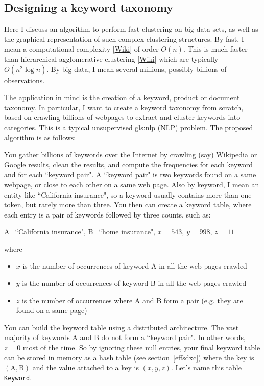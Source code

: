 \documentclass[oneside,10pt]{book}
\begin{document}
\subsection{Designing a keyword taxonomy}

Here I discuss an algorithm to perform fast clustering on big data sets, as well as the graphical representation of such complex clustering structures. By fast, I mean a \textcolor{index}{computational complexity} [\href{https://en.wikipedia.org/wiki/Computational_complexity}{Wiki}] of order $O(n)$. This is much faster than
\textcolor{index}{hierarchical agglomerative clustering} [\href{https://en.wikipedia.org/wiki/Hierarchical_clustering}{Wiki}] which are typically $O(n^2 \log n)$. By big data, I mean several millions, possibly billions of observations.

The application in mind is the creation of a keyword, product or document taxonomy. In particular, I want to create a keyword taxonomy from scratch, based
on crawling billions of webpages to extract and cluster keywords into categories. This is a typical unsupervised \gls{gls:nlp} (NLP) problem.
The proposed algorithm is as follows: \vspace{1ex}

\label{ppioppoo}

\noindent You gather billions of keywords over the Internet by crawling (say) Wikipedia or Google results, clean the results, and compute the frequencies for each keyword and for each ``keyword pair". A ``keyword pair" is two keywords found on a same webpage, or close to each other on a same web page. Also by keyword, I mean an entity like ``California insurance", so a keyword usually contains more than one token, but rarely more than three. You then can create a keyword table,  where each entry is a pair of keywords followed by three counts, such as: %
\begin{center}
A=``California insurance", B=``home insurance", $x=543$, $y=998$, $z=11$
\end{center}
where
\begin{itemize}
	\item $x$ is the number of occurrences of keyword A in all the web pages crawled
	\item $y$ is the number of occurrences of keyword B in all the web pages crawled
	\item $z$ is the number of occurrences where A and B form a pair (e.g. they are found on a same page)
\end{itemize}
You can build the keyword table using a distributed architecture. The vast majority of keywords A and B do not form a
``keyword pair". In other words, $z=0$ most of the time. So by ignoring these null entries, your final keyword table can be stored in memory
as a \textcolor{index}{hash table} (see section~\ref{effsdxc}) where the key is $(\text{A}, \text{B})$ and the value
 attached to a key is $(x, y, z)$. Let's name this table \texttt{Keyword}.\vspace{1ex}
\end{document}
